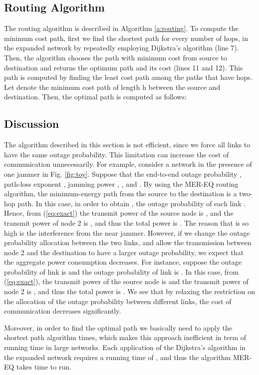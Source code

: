 \documentclass[10pt,journal]{IEEEtran}
\theoremstyle{definition}
\begin{document}
\subsection{Routing Algorithm}
The routing algorithm is described in Algorithm \ref{a:routing}. To compute  the minimum cost path, first we find the shortest path for every number of hops,   in the expanded network by repeatedly employing   Dijkstra's algorithm (line 7). 
Then, the algorithm chooses the path with minimum cost from source to destination and returns the optimum path and its cost (lines 11 and 12).
This path is computed by finding the least cost path among the paths that have  hops. Let  denote the minimum cost path of length h between the source and destination. Then, the optimal path is computed as follows:

\vspace{-17pt}
\subsection{Discussion} \label{sec:disc}
The algorithm described in this section is not efficient, since we force all links to have the same outage probability. This limitation can increase the cost of communication unnecessarily.
For example, consider a network in the presence of one  jammer in Fig. \ref{fig:toy}.
Suppose that the end-to-end outage probability ,  path-loss exponent ,  jamming power , , and .
By using the MER-EQ routing algorithm, the minimum-energy path from the source to the destination is a two-hop path. 
In this case, in order to obtain , the outage probability of each link  . 
Hence, from (\ref{eq:exact}) the transmit  power of the source node is , and the transmit power of node 2 is , and thus the total power is . 
The reason that  is  so high is the interference from the near jammer.
However, if we change the outage probability allocation between the two links, and allow the transmission between node 2 and the destination to have a larger outage probability, we expect that the aggregate power consumption decreases.
For instance, suppose the outage probability of link  is  and the outage probability of link  is .  
In this case, from  (\ref{eq:exact}), the transmit power of the source node is  and the transmit power of node 2 is , and thus the total power is .
We see that by relaxing the restriction on the allocation of the outage probability between different links, the cost of communication decreases significantly.

Moreover, in order to find the optimal path we basically need to apply the shortest path algorithm  times, which makes this approach inefficient in term of running time in large networks.
Each application of the Dijkstra's algorithm in the expanded network requires a running time of , and thus the algorithm MER-EQ takes  time to run.
\end{document}
